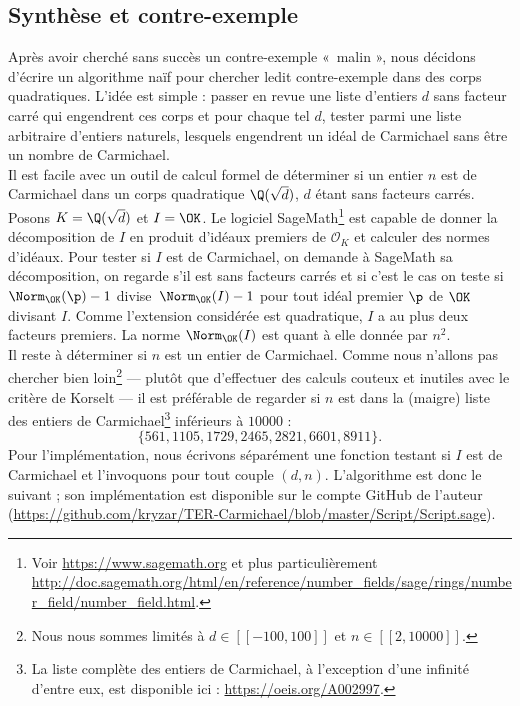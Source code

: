 \documentclass[a4paper, 12pt, oneside]{article}
\begin{document}
\subsection{Synthèse et contre-exemple}

Après avoir cherché sans succès un contre-exemple « malin », nous décidons d'écrire un algorithme naïf pour chercher ledit contre-exemple dans des corps quadratiques. L'idée est simple : passer en revue une liste d'entiers $d$ sans facteur carré qui engendrent ces corps et pour chaque tel $d$, tester parmi une liste arbitraire d'entiers naturels, lesquels engendrent un idéal de Carmichael sans être un nombre de Carmichael. \\

Il est facile avec un outil de calcul formel de déterminer si un entier $n$ est de Carmichael dans un corps quadratique $\Q(\sqrt{d})$, $d$ étant sans facteurs carrés. Posons $K=\Q(\sqrt{d})$ et $I = \OK$. Le logiciel SageMath\footnote{Voir \url{https://www.sagemath.org} et plus particulièrement \url{http://doc.sagemath.org/html/en/reference/number_fields/sage/rings/number_field/number_field.html}.} est capable de donner la décomposition de $I$ en produit d'idéaux premiers de $\mathcal{O}_K$ et calculer des normes d'idéaux. Pour tester si $I$ est de Carmichael, on demande à SageMath sa décomposition, on regarde s'il est sans facteurs carrés et si c'est le cas on teste si $\Norm_\OK(\p) - 1$ divise $\Norm_\OK(I) - 1$ pour tout idéal premier $\p$ de $\OK$ divisant $I$. Comme l'extension considérée est quadratique, $I$ a au plus deux facteurs premiers. La norme $\Norm_\OK(I)$ est quant à elle donnée par $n^2$. \\

Il reste à déterminer si $n$ est un entier de Carmichael. Comme nous n'allons pas chercher bien loin\footnote{Nous nous sommes limités à $d\in [\![-100, 100]\!]$ et $n\in [\![2, 10000]\!]$.} — plutôt que d'effectuer des calculs couteux et inutiles avec le critère de Korselt — il est préférable de regarder si $n$ est dans la (maigre) liste des entiers de Carmichael\footnote{La liste complète des entiers de Carmichael, à l'exception d'une infinité d'entre eux, est disponible ici : \url{https://oeis.org/A002997}.} inférieurs à $10000$ : $$\{561, 1105, 1729, 2465, 2821, 6601, 8911\}.$$ Pour l'implémentation, nous écrivons séparément une fonction testant si $I$ est de Carmichael et l'invoquons pour tout couple $(d, n)$. L'algorithme est donc le suivant ; son implémentation est disponible sur le compte GitHub de l'auteur (\url{https://github.com/kryzar/TER-Carmichael/blob/master/Script/Script.sage}).
\end{document}
